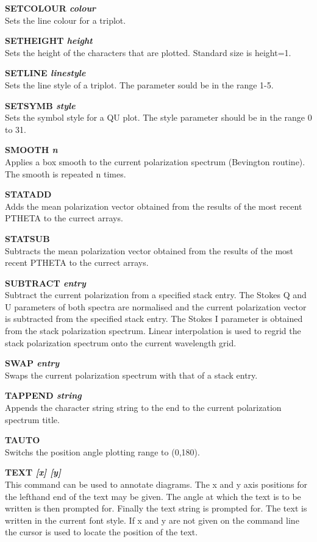 \documentclass[11pt,nolof,noabs]{starlink}
\begin{document}
\textbf{SETCOLOUR \it colour} \\
Sets the line colour for a triplot.

\textbf{SETHEIGHT \it height} \\
Sets the height of the characters that are plotted. Standard size is height=1.

\textbf{SETLINE \it linestyle} \\
Sets the line style of a triplot. The parameter sould be in the range 1-5.

\textbf{SETSYMB \it  style} \\
Sets the symbol style for a QU plot. The style parameter should be in the
range 0 to 31.

\textbf{SMOOTH  \it n} \\
Applies a box smooth to the current polarization spectrum (Bevington
routine). The smooth is repeated n times.

\textbf{STATADD} \\
Adds the mean polarization vector obtained from the results of the most recent
PTHETA to the currect arrays.

\textbf{STATSUB} \\
Subtracts the mean polarization vector obtained from the results of
the most recent PTHETA to the currect arrays.

\textbf{SUBTRACT \it  entry } \\
Subtract the current polarization from a specified stack entry. The Stokes Q
and U parameters of both spectra are normalised and the current polarization
vector is subtracted from the specified stack entry. The Stokes I parameter
is obtained from the stack polarization spectrum. Linear interpolation is used
to regrid the stack polarization spectrum onto the current wavelength grid.

\textbf{SWAP \it  entry} \\
Swaps the current polarization spectrum with that of a stack entry.

\textbf{TAPPEND \it string} \\
Appends the character string string to the end to the current polarization
spectrum title.

\textbf{TAUTO} \\
Switchs the position angle plotting range to (0,180).

\textbf{TEXT \it  [x] [y]} \\
This command can be used to annotate diagrams. The x and y axis positions for
the lefthand end of the text may be given. The angle at which the text is
to be written is then prompted for. Finally the text string is prompted for.
The text is written in the current font style. If x and y are not given on
the command line the cursor is used to locate the position of the text.
\end{document}
